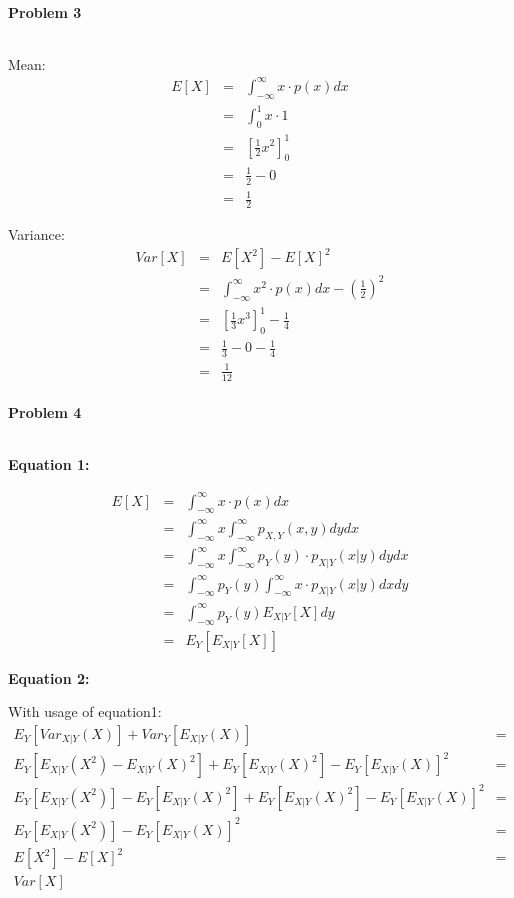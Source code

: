 \documentclass{article}
\begin{document}
\paragraph*{Problem 3}
$\;$ 

Mean:
\begin{eqnarray}
E[X] &=& \int_{-\infty}^{\infty}x \cdot p(x) dx\\
&=& \int_0^1 x \cdot 1\\
&=& \left[ \frac{1}{2} x^2\right] _0^1\\
&=& \frac{1}{2} - 0\\
&=& \frac{1}{2}
\end{eqnarray}

Variance:
\begin{eqnarray}
Var[X] &=& E[X^2] - E[X]^2\\
&=& \int_{-\infty}^{\infty}x^2 \cdot p(x) dx - \left(\frac{1}{2}\right)^2\\
&=& \left[\frac{1}{3} x^3\right]_0^1 - \frac{1}{4}\\
&=& \frac{1}{3} - 0 - \frac{1}{4}\\
&=& \frac{1}{12}
\end{eqnarray}

\paragraph*{Problem 4}
$\;$ 

\textbf{Equation 1:}

\begin{eqnarray}
E[X] &=& \int_{-\infty}^{\infty}{x \cdot p(x)} dx \\
&=& \int_{-\infty}^{\infty}{x \int_{-\infty}^{\infty}{p_{X,Y}(x,y)} dy} dx\\
&=& \int_{-\infty}^{\infty}{x \int_{-\infty}^{\infty}{p_Y(y)\cdot p_{X|Y}(x|y)} dy} dx\\
&=& \int_{-\infty}^{\infty}{p_Y(y) \int_{-\infty}^{\infty}{x \cdot p_{X|Y}(x|y)} dx} dy\\
&=& \int_{-\infty}^{\infty}{p_Y(y) E_{X|Y}[X]} dy\\
&=& E_Y[E_{X|Y}[X]]
\end{eqnarray}

\textbf{Equation 2:}

With usage of equation1: 
\begin{eqnarray}
E_Y[Var_{X|Y}(X)] + Var_Y[E_{X|Y}(X)] &=& \\
E_Y[E_{X|Y}(X^2) - E_{X|Y}(X)^2] + E_Y[E_{X|Y}(X)^2] - E_Y[E_{X|Y}(X)]^2  &=& \\
E_Y[E_{X|Y}(X^2)] - E_Y[E_{X|Y}(X)^2] + E_Y[E_{X|Y}(X)^2] - E_Y[E_{X|Y}(X)]^2  &=& \\
E_Y[E_{X|Y}(X^2)] - E_Y[E_{X|Y}(X)]^2  &=& \\
E[X^2] - E[X]^2 &=&\\
Var[X]
\end{eqnarray}
\end{document}

